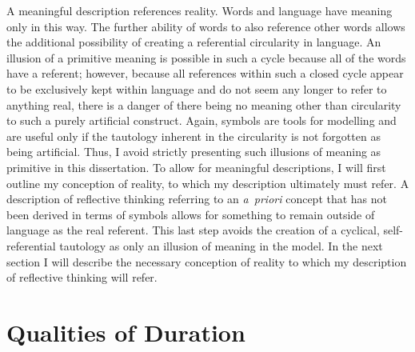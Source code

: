 A meaningful description references reality.  Words and language have
meaning only in this way.  The further ability of words to also
reference other words allows the additional possibility of creating a
referential circularity in language.  An illusion of a primitive
meaning is possible in such a cycle because all of the words have a
referent; however, because all references within such a closed cycle
appear to be exclusively kept within language and do not seem any
longer to refer to anything real, there is a danger of there being no
meaning other than circularity to such a purely artificial construct.
Again, symbols are tools for modelling and are useful only if the
tautology inherent in the circularity is not forgotten as being
artificial.  Thus, I avoid strictly presenting such illusions of
meaning as primitive in this dissertation.  To allow for meaningful
descriptions, I will first outline my conception of reality, to which
my description ultimately must refer.  A description of reflective
thinking referring to an \emph{a~priori} concept that has not been
derived in terms of symbols allows for something to remain outside of
language as the real referent.  This last step avoids the creation of
a cyclical, self-referential tautology as only an illusion of meaning
in the model.  In the next section I will describe the necessary
conception of reality to which my description of reflective thinking
will refer.

\section{Qualities of Duration}

